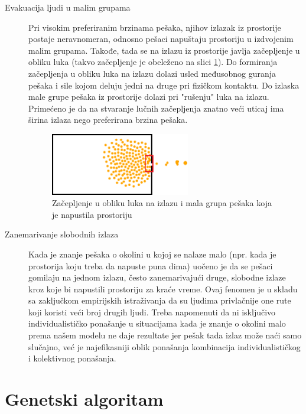 \documentclass[12pt]{article}
\begin{document}
\begin{description}
\item[Evakuacija ljudi u malim grupama]
Pri visokim preferiranim brzinama pešaka, njihov izlazak iz prostorije postaje neravnomeran, odnosno pešaci napuštaju prostoriju u izdvojenim malim grupama. Takođe, tada se na izlazu iz prostorije javlja začepljenje u obliku luka (takvo začepljenje je obeleženo na slici \ref{fig:grupa}). Do formiranja začepljenja u obliku luka na izlazu dolazi usled međusobnog guranja pešaka i sile kojom deluju jedni na druge pri fizičkom kontaktu. Do izlaska male grupe pešaka iz prostorije dolazi pri "rušenju" luka na izlazu. Primećeno je da na stvaranje lučnih začepljenja znatno veći uticaj ima širina izlaza nego preferirana brzina pešaka.
\begin{figure}[H]
\centering
\includegraphics[width=0.6\textwidth]{03_Luk_i_grupice}
\caption{Začepljenje u obliku luka na izlazu i mala grupa pešaka koja je napustila prostoriju}
\label{fig:grupa}
\end{figure}

\item[Zanemarivanje slobodnih izlaza]

Kada je znanje pešaka o okolini u kojoj se nalaze malo (npr. kada je prostorija koju treba da napuste puna dima) uočeno je da se pešaci gomilaju na jednom izlazu, često zanemarivajući druge, slobodne izlaze kroz koje bi napustili prostoriju za kraće vreme. Ovaj fenomen je u skladu sa zaključkom empirijskih istraživanja da su ljudima privlačnije one rute koji koristi veći broj drugih ljudi. Treba napomenuti da ni isključivo individualističko ponašanje u situacijama kada je znanje o okolini malo prema našem modelu ne daje rezultate jer pešak tada izlaz može naći samo slučajno, već je najefikasniji oblik ponašanja kombinacija individualističkog i kolektivnog ponašanja.


\end{description}
    
    \label{fenomeni}

\section{Genetski algoritam}\label{GA}
\end{document}
